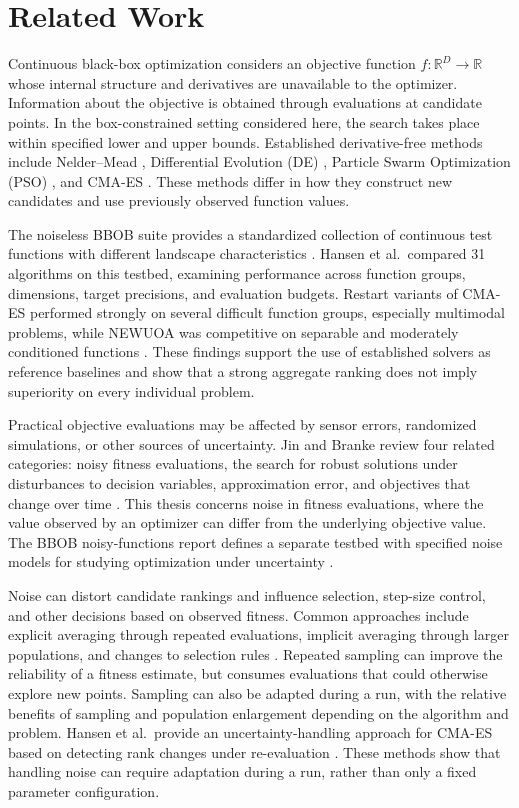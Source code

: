 \chapter{Related Work}
\label{chap:research}

Continuous black-box optimization considers an objective function
$f:\mathbb{R}^{D}\rightarrow\mathbb{R}$ whose internal structure and
derivatives are unavailable to the optimizer. Information about the
objective is obtained through evaluations at candidate points. In the
box-constrained setting considered here, the search takes place within
specified lower and upper bounds. Established derivative-free methods
include Nelder--Mead \cite{Nelder1965}, Differential Evolution (DE)
\cite{Storn1997}, Particle Swarm Optimization (PSO) \cite{Kennedy1995},
and CMA-ES \cite{Hansen2001}. These methods differ in how they construct
new candidates and use previously observed function values.

The noiseless BBOB suite provides a standardized collection of continuous
test functions with different landscape characteristics
\cite{Hansen2009Noiseless}. Hansen et al.\ compared 31 algorithms on
this testbed, examining performance across function groups, dimensions,
target precisions, and evaluation budgets. Restart variants of CMA-ES
performed strongly on several difficult function groups, especially
multimodal problems, while NEWUOA \cite{Powell2006} was competitive on
separable and moderately conditioned functions \cite{Hansen2010}.
These findings support the use of established solvers as reference
baselines and show that a strong aggregate ranking does not imply
superiority on every individual problem.

Practical objective evaluations may be affected by sensor errors,
randomized simulations, or other sources of uncertainty. Jin and Branke
review four related categories: noisy fitness evaluations, the search
for robust solutions under disturbances to decision variables,
approximation error, and objectives that change over time
\cite{Jin2005}. This thesis concerns noise in fitness evaluations,
where the value observed by an optimizer can differ from the underlying
objective value. The BBOB noisy-functions report defines a separate
testbed with specified noise models for studying optimization under
uncertainty \cite{Hansen2009Noisy}.

Noise can distort candidate rankings and influence selection, step-size
control, and other decisions based on observed fitness. Common approaches
include explicit averaging through repeated evaluations, implicit
averaging through larger populations, and changes to selection rules
\cite{Jin2005}. Repeated sampling can improve the reliability of a
fitness estimate, but consumes evaluations that could otherwise explore
new points. Sampling can also be adapted during a run, with the relative
benefits of sampling and population enlargement depending on the
algorithm and problem. Hansen et al.\ provide an
uncertainty-handling approach for CMA-ES based on detecting rank changes
under re-evaluation \cite{Hansen2009}. These methods show that handling
noise can require adaptation during a run, rather than only a fixed
parameter configuration.

